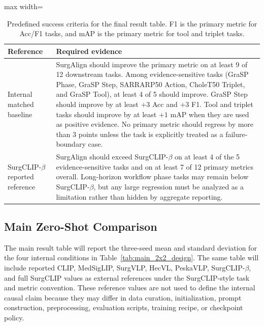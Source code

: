 \begin{table}[t]
\centering
\scriptsize
\setlength{\tabcolsep}{4pt}
\renewcommand{\arraystretch}{1.1}
\caption{Predefined success criteria for the final result table. F1 is the primary metric for Acc/F1 tasks, and mAP is the primary metric for tool and triplet tasks.}
\label{tab:success_criteria}
\begin{adjustbox}{max width=\textwidth}
\begin{tabular}{@{}lp{}@{}}
\toprule
Reference & Required evidence \\
\midrule
Internal matched baseline &
SurgAlign should improve the primary metric on at least 9 of 12 downstream tasks. Among evidence-sensitive tasks (GraSP Phase, GraSP Step, SARRARP50 Action, CholeT50 Triplet, and GraSP Tool), at least 4 of 5 should improve. GraSP Step should improve by at least $+3$ Acc and $+3$ F1. Tool and triplet tasks should improve by at least $+1$ mAP when they are used as positive evidence. No primary metric should regress by more than $3$ points unless the task is explicitly treated as a failure-boundary case. \\
\addlinespace
SurgCLIP-$\beta$ reported reference &
SurgAlign should exceed SurgCLIP-$\beta$ on at least 4 of the 5 evidence-sensitive tasks and on at least 7 of 12 primary metrics overall. Long-horizon workflow phase tasks may remain below SurgCLIP-$\beta$, but any large regression must be analyzed as a limitation rather than hidden by aggregate reporting. \\
\bottomrule
\end{tabular}
\end{adjustbox}
\end{table}

\subsection{Main Zero-Shot Comparison}
\label{sec:exp_main}

The main result table will report the three-seed mean and standard deviation for the four internal conditions in Table~\ref{tab:main_2x2_design}. The same table will include reported CLIP, MedSigLIP, SurgVLP, HecVL, PeskaVLP, SurgCLIP-$\beta$, and full SurgCLIP values as external references under the SurgCLIP-style task and metric convention. These reference values are not used to define the internal causal claim because they may differ in data curation, initialization, prompt construction, preprocessing, evaluation scripts, training recipe, or checkpoint policy.


